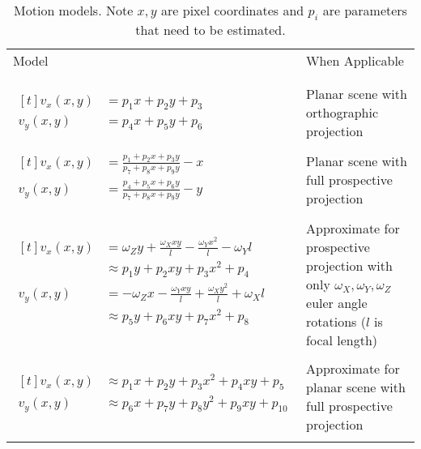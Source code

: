 \begin{table}
    \begin{center}
        \begin{tabular}[t]{@{}lp{2.6cm}}

            Model & When Applicable \\
            \\
            \hline
            \\
            {$\begin{aligned}[t]
                  v_x(x,y) &= p_1 x + p_2 y + p_3 \\
                  v_y(x,y) &= p_4 x + p_5 y + p_6
            \end{aligned}$} & Planar scene with orthographic projection \\
            \\
            {$\begin{aligned}[t]
                  v_x(x,y) &= \frac{p_1+p_2 x + p_3 y}{p_7 + p_8 x + p_9 y} - x\\
                  v_y(x,y) &= \frac{p_4+p_5 x + p_6 y}{p_7 + p_8 x + p_9 y} - y\\
            \end{aligned}$} & Planar scene with full prospective projection \\
            \\
            {$\begin{aligned}[t]
                  v_x(x,y) &= \omega_Z y + \frac{\omega_X xy}{l} - \frac{\omega_Y x^2}{l} - \omega_Y l \\
                  &\approx p_1 y + p_2 xy + p_3 x^2 + p_4 \\
                  v_y(x,y) &= -\omega_Z x - \frac{\omega_Y xy}{l} + \frac{\omega_X y^2}{l} + \omega_X l \\
                  &\approx p_5 y + p_6 xy + p_7 x^2 + p_8 \\
                  &
            \end{aligned}$} & Approximate for prospective projection with only $\omega_X, \omega_Y, \omega_Z$ euler angle rotations ($l$ is focal length) \\
            \\
            {$\begin{aligned}[t]
                  v_x(x,y) &\approx p_1 x + p_2 y + p_3 x^2 + p_4 xy + p_5 \\
                  v_y(x,y) &\approx p_6 x + p_7 y + p_8 y^2 + p_9 xy + p_{10} \\
                  &
            \end{aligned}$} & Approximate for planar scene with full prospective projection\\
            \\
        \end{tabular}
    \end{center}
    \caption{Motion models\cite{Trucco:1998:ITC:551277}. Note $x,y$ are pixel coordinates and $p_i$ are parameters that need to be estimated.}
    \label{table:transformations}
\end{table}
